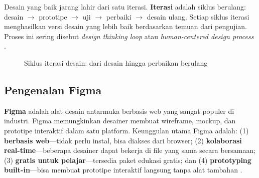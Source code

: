 Desain yang baik jarang lahir dari satu iterasi. \textbf{Iterasi} adalah siklus berulang: desain $\rightarrow$ prototipe $\rightarrow$ uji $\rightarrow$ perbaiki $\rightarrow$ desain ulang. Setiap siklus iterasi menghasilkan versi desain yang lebih baik berdasarkan temuan dari pengujian. Proses ini sering disebut \textit{design thinking loop} atau \textit{human-centered design process} \cite{ixdf}.

\begin{figure}[H]
\centering
{}
\caption{Siklus iterasi desain: dari desain hingga perbaikan berulang}
\end{figure}

\subsection{Pengenalan Figma}

\textbf{Figma} adalah alat desain antarmuka berbasis web yang sangat populer di industri. Figma memungkinkan desainer membuat wireframe, mockup, dan prototipe interaktif dalam satu platform. Keunggulan utama Figma adalah: (1) \textbf{berbasis web}---tidak perlu instal, bisa diakses dari browser; (2) \textbf{kolaborasi real-time}---beberapa desainer dapat bekerja di file yang sama secara bersamaan; (3) \textbf{gratis untuk pelajar}---tersedia paket edukasi gratis; dan (4) \textbf{prototyping built-in}---bisa membuat prototipe interaktif langsung tanpa alat tambahan \cite{figmaDocs}.

